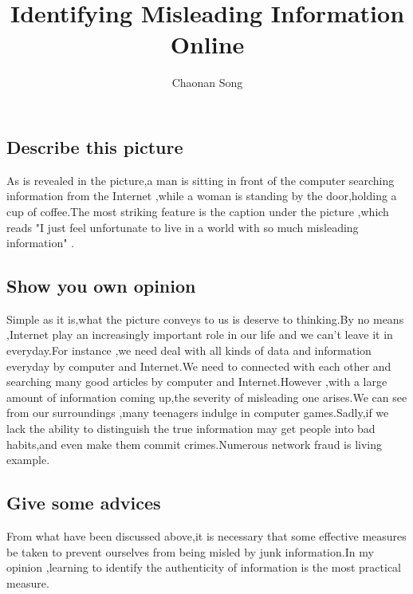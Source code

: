 \documentclass{ctexart}
\begin{document}
\title{Identifying Misleading Information Online}
\author{Chaonan Song}
\maketitle
\subsection{Describe this picture }
\par As is revealed in the picture,a man is sitting in front of the computer searching information from the Internet ,while a woman is standing by the door,holding a cup of coffee.The most striking feature is the caption under the picture ,which reads "I just feel unfortunate to live in a world with so much misleading information" .
\subsection{Show you own opinion}
\par Simple as it is,what the picture conveys to us is deserve to thinking.By no means ,Internet play an increasingly important role in our life and we can't leave it in everyday.For instance ,we need deal with all kinds of data and information everyday by computer and Internet.We need to connected with each other and searching many good articles by computer and Internet.However ,with a large amount of information coming up,the severity of misleading one arises.We can see from our surroundings ,many teenagers indulge in computer games.Sadly,if we lack the ability to distinguish the true information may get people into bad habits,and even make them commit crimes.Numerous network fraud is living example.
\subsection{Give some advices}
\par From what have been discussed above,it is necessary that some effective measures be taken to prevent ourselves from being misled by junk information.In my opinion ,learning to identify the authenticity of information is the most practical measure.  
\end{document}
